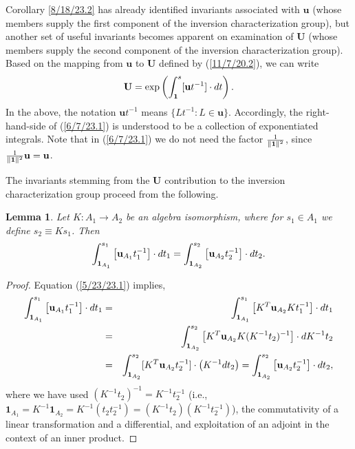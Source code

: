 \documentclass{amsart}
\numberwithin{equation}{section}
\newtheorem{lemma}[theorem]{Lemma}
\theoremstyle{definition}
\numberwithin{theorem}{section}
\begin{document}
Corollary \ref{8/18/23.2} has already identified invariants associated with $\mathbf{u}$ (whose members supply the first component of the inversion characterization group), but another set of useful invariants becomes apparent on examination of $\mathbf{U}$ (whose members supply the second component of the inversion characterization group).  Based on the mapping from $\mathbf{u}$ to $\mathbf{U}$ defined by (\ref{11/7/20.2}),  we can write \begin{equation}  \mathbf{U} = \exp\left(\int_{\bf 1}^s [\mathbf{u}t^{-1}]\cdot dt\right). \label{6/7/23.1}\end{equation}  In the above, the notation $\mathbf{u}t^{-1}$ means $\{Lt^{-1}: L\in \mathbf{u}\}$.  Accordingly, the right-hand-side of (\ref{6/7/23.1}) is understood to be a collection of exponentiated integrals.   Note that in (\ref{6/7/23.1}) we do not need the factor $\frac{1}{\|{\bf 1}\|^2}$, since $\frac{1}{\|{\bf 1}\|^2}\mathbf{u}=\mathbf{u}$.  



The invariants stemming from the $\mathbf{U}$ contribution to the inversion characterization group proceed from the following. 



\begin{lemma}\label{6/6/23.2} Let $K:A_1\rightarrow A_2$ be an algebra isomorphism, where for $s_1\in A_1$ we define $s_2\equiv Ks_1$.  Then \[ \int_{{\bf 1}_{A_1}}^{s_1} \left[\mathbf{u}_{A_1}t_1^{-1}\right]\cdot dt_1 
= \int_{{\bf 1}_{A_2}}^{s_2} \left[\mathbf{u}_{A_2}t_2^{-1}\right]\cdot dt_2 . \] \end{lemma}

\begin{proof} 
Equation (\ref{5/23/23.1}) implies,
\begin{eqnarray*} \int_{{\bf 1}_{A_1}}^{s_1} \left[\mathbf{u}_{A_1}t_1^{-1}\right]\cdot dt_1 &=& \int_{{\bf 1}_{A_1}}^{s_1} \left[ K^T\mathbf{u}_{A_2}Kt_1^{-1}\right]\cdot dt_1 \\ &=& 
\int_{{\bf 1}_{A_2}}^{s_2} \left[ K^T\mathbf{u}_{A_2}K (K^{-1}t_2)^{-1}\right]\cdot dK^{-1}t_2 \\ &=& \int_{{\bf 1}_{A_2}}^{s_2} [K^T\mathbf{u}_{A_2}t_2^{-1}]\cdot \left(K^{-1}dt_2\right) = \int_{{\bf 1}_{A_2}}^{s_2} \left[\mathbf{u}_{A_2}t_2^{-1}\right]\cdot dt_2, 
\end{eqnarray*}
where we have used $(K^{-1}t_2)^{-1} = K^{-1}t_2^{-1}$ (i.e., $\mathbf{1}_{A_1} = K^{-1}\mathbf{1}_{A_2} = K^{-1}(t_2t_2^{-1}) = (K^{-1}t_2)(K^{-1}t_2^{-1})$), the commutativity of a linear transformation and a differential, and exploitation of an adjoint in the context of an inner product.
\end{proof}
\end{document}
